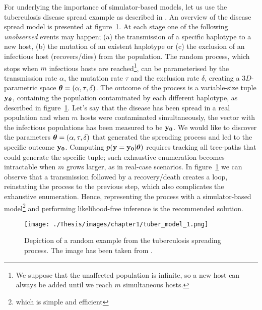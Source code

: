 For underlying the importance of simulator-based models, let us use
the tuberculosis disease spread example as described in
\autocite{Tanaka2006}. An overview of the disease spread model is
presented at figure~\ref{fig:tuberculosis_model}. At each stage one of
the following \textit{unobserved} events may happen; (a) the
transmission of a specific haplotype to a new host, (b) the mutation
of an existent haplotype or (c) the exclusion of an infectious host
(recovers/dies) from the population. The random process, which stops
when $m$ infectious hosts are reached\footnote{We suppose that the
  unaffected population is infinite, so a new host can always be added
  until we reach $m$ simultaneous hosts.}, can be parameterised by the
transmission rate $\alpha$, the mutation rate $\tau$ and the exclusion
rate $\delta$, creating a $3D$-parametric space
$\boldsymbol{\theta} = (\alpha, \tau, \delta)$. The outcome of the process is a
variable-size tuple $\mathbf{y}_{\boldsymbol{\theta}}$, containing the population
contaminated by each different haplotype, as described in
figure~\ref{fig:tuberculosis_model}. Let's say that the disease has
been spread in a real population and when $m$ hosts were contaminated
simultaneously, the vector with the infectious populations has been
measured to be $\mathbf{y_0}$. We would like to discover the parameters
$\boldsymbol{\theta} = (\alpha, \tau, \delta)$ that generated the spreading
process and led to the specific outcome $\mathbf{y_0}$. Computing
$p(\mathbf{y}=\mathbf{y_0}|\boldsymbol{\theta})$ requires tracking all tree-paths that could
generate the specific tuple; such exhaustive enumeration becomes
intractable when $m$ grows larger, as in real-case scenarios. In
figure~\ref{fig:tuberculosis_model} we can observe that a transmission
followed by a recovery/death creates a loop, reinstating the process
to the previous step, which also complicates the exhaustive
enumeration. Hence, representing the process with a simulator-based
model\footnote{which is simple and efficient} and performing
likelihood-free inference is the recommended solution.

\begin{figure}[!ht]
    \begin{center}
      \texttt{[image: ./Thesis/images/chapter1/tuber\_model\_1.png]}
    \end{center}
    \caption[The tuberculosis spreading process.]{Depiction of a random example from the tuberculosis
      spreading process. The image has been taken from
      \autocite{Lintusaari2017}.}
    \label{fig:tuberculosis_model}
\end{figure}

